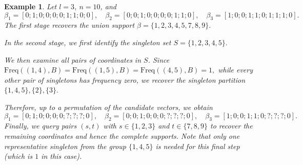\documentclass{article}
\newcommand{\xl}[1]{{\color{blue}#1}}
\newtheorem{example}{Example}[section]
\begin{document}

\begin{example}
Let $l=3$, $n=10$, and
\[
\beta_1=[0;1;0;0;0;0;1;1;0;0],\quad
\beta_2=[0;0;1;0;0;0;0;1;1;0],\quad
\beta_3=[1;0;0;1;1;0;1;1;1;0].
\]
The first stage recovers the union support
\(
\beta=\{1,2,3,4,5,7,8,9\}.
\)

In the second stage, we first identify the singleton set
\(
S=\{1,2,3,4,5\}.
\)

We then examine all pairs of coordinates in $S$. Since
\(
\mathrm{Freq}((1,4),B)
=\mathrm{Freq}((1,5),B)
=\mathrm{Freq}((4,5),B)=1,
\)
while every other pair of singletons has frequency zero, we recover the singleton partition
\(
\{1,4,5\},\{2\},\{3\}.
\)

Therefore, up to a permutation of the candidate vectors, we obtain
\[
\beta_1=[0;1;0;0;0;0;?;?;?;0],\quad
\beta_2=[0;0;1;0;0;0;?;?;?;0],\quad
\beta_3=[1;0;0;1;1;0;?;?;?;0].
\]
Finally, we query pairs $(s,t)$ with $s\in\{1,2,3\}$ and $t\in\{7,8,9\}$ to recover the remaining coordinates and hence the complete supports. Note that only one representative singleton from the group $\{1,4,5\}$ is needed for this final step (which is $1$ in this case).
\end{example}
\end{document}
